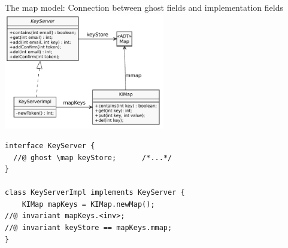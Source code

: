 \documentclass{beamer}
\begin{document}
\begin{frame}[fragile]{The map model: Connection between ghost fields and implementation fields}
\includegraphics[width=7cm]{imap_partial}  
  
\begin{lstlisting}
interface KeyServer {
  //@ ghost \map keyStore;      /*...*/ 
}

class KeyServerImpl implements KeyServer {
    KIMap mapKeys = KIMap.newMap();
//@ invariant mapKeys.<inv>;
//@ invariant keyStore == mapKeys.mmap;
}
\end{lstlisting}
\end{frame}
\end{document}
